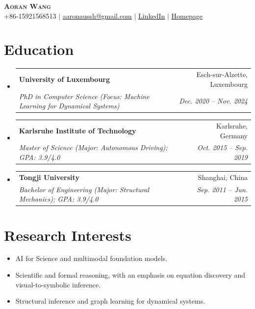 \documentclass[letterpaper,11pt]{article}
\makeatletter
\newcommand{\resumeItem}[1]{
  \item\small{
    {#1 \vspace{-2pt}}
  }
}
\newcommand{\resumeSubheading}[4]{
  \Needspace{6\baselineskip}
  \vspace{-2pt}\item
    \begin{tabular*}{0.97\textwidth}[t]{l@{\extracolsep{\fill}}r}
      \textbf{#1} & #2 \\
      \textit{\small#3} & \textit{\small #4} \\
    \end{tabular*}\vspace{-7pt}
}
\newcommand{\resumeSubHeadingListStart}{\begin{itemize}[leftmargin=0.15in, label={}]}
\newcommand{\resumeSubHeadingListEnd}{\end{itemize}}
\newcommand{\resumeItemListStart}{\begin{itemize}[leftmargin=0.20in]}
\newcommand{\resumeItemListEnd}{\end{itemize}\vspace{-5pt}}
\makeatother
\begin{document}

\begin{center}
    \textbf{\Huge \scshape Aoran Wang} \\ \vspace{1pt}
    \small +86-15921568513 $|$ \href{mailto:aaronaussh@gmail.com}{\underline{aaronaussh@gmail.com}} $|$ 
    \href{https://linkedin.com/in/aoran-wang-221240152/}{\underline{LinkedIn}} $|$
    \href{https://wang422003.github.io}{\underline{Homepage}} \\
\end{center}


\section{Education}
  \resumeSubHeadingListStart
    \resumeSubheading
      {University of Luxembourg}{Esch-sur-Alzette, Luxembourg}
      {PhD in Computer Science (Focus: Machine Learning for Dynamical Systems)}{Dec. 2020 -- Nov. 2024}
    \resumeSubheading
      {Karlsruhe Institute of Technology}{Karlsruhe, Germany}
      {Master of Science (Major: Autonomous Driving); GPA: 3.9/4.0}{Oct. 2015 -- Sep. 2019}
    \resumeSubheading
      {Tongji University}{Shanghai, China}
      {Bachelor of Engineering (Major: Structural Mechanics); GPA: 3.9/4.0}{Sep. 2011 -- Jun. 2015}
  \resumeSubHeadingListEnd
  
\section{Research Interests}
\resumeItemListStart
  \resumeItem{AI for Science and multimodal foundation models.}
  \resumeItem{Scientific and formal reasoning, with an emphasis on equation discovery and visual-to-symbolic inference.}
  \resumeItem{Structural inference and graph learning for dynamical systems.}
\resumeItemListEnd
\end{document}

